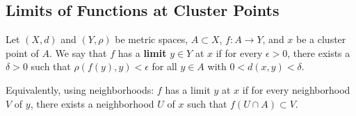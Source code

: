 \subsection{Limits of Functions at Cluster Points}
\begin{definition}
    Let $(X,d)$ and $(Y,\rho)$ be metric spaces, $A \subset X$, $f: A \rightarrow Y$, and $x$ be a cluster point of $A$. We say that $f$ has a \textbf{limit} $y \in Y$ at $x$ if for every $\epsilon > 0$, there exists a $\delta > 0$ such that $\rho(f(y),y) < \epsilon$ for all $y \in A$ with $0 < d(x,y) < \delta$.

    Equivalently, using neighborhoods: $f$ has a limit $y$ at $x$ if for every neighborhood $V$ of $y$, there exists a neighborhood $U$ of $x$ such that $f(U \cap A) \subset V$.
\end{definition}







